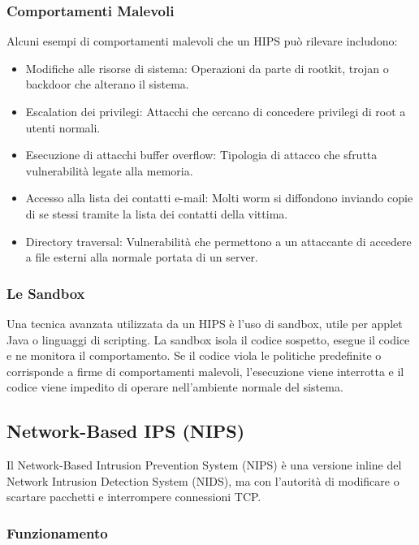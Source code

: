 \subsubsection{Comportamenti Malevoli}

Alcuni esempi di comportamenti malevoli che un HIPS può rilevare includono:

\begin{itemize}
    \item Modifiche alle risorse di sistema: Operazioni da parte di rootkit, trojan o backdoor che alterano il sistema.
    \item Escalation dei privilegi: Attacchi che cercano di concedere privilegi di root a utenti normali.
    \item Esecuzione di attacchi buffer overflow: Tipologia di attacco che sfrutta vulnerabilità legate alla memoria.
    \item Accesso alla lista dei contatti e-mail: Molti worm si diffondono inviando copie di se stessi tramite la lista dei contatti della vittima.
    \item Directory traversal: Vulnerabilità che permettono a un attaccante di accedere a file esterni alla normale portata di un server.
\end{itemize}

\subsubsection{Le Sandbox}

Una tecnica avanzata utilizzata da un HIPS è l'uso di sandbox, utile per applet Java o linguaggi di scripting. La sandbox isola il codice sospetto, esegue il codice e ne monitora il comportamento. Se il codice viola le politiche predefinite o corrisponde a firme di comportamenti malevoli, l'esecuzione viene interrotta e il codice viene impedito di operare nell'ambiente normale del sistema.

\subsection{Network-Based IPS (NIPS)}

Il Network-Based Intrusion Prevention System (NIPS) è una versione inline del Network Intrusion Detection System (NIDS), ma con l'autorità di modificare o scartare pacchetti e interrompere connessioni TCP.

\subsubsection{Funzionamento}


